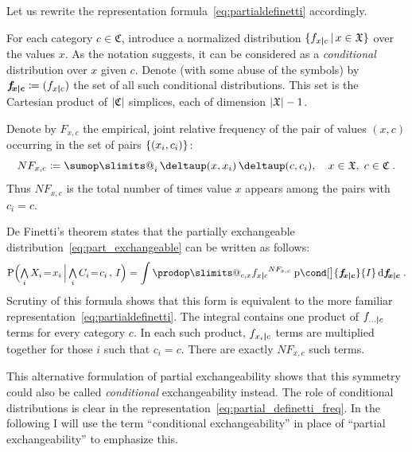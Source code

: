 \documentclass[\ifafour a4paper,12pt,\else a5paper,10pt,\fi%
onecolumn,oneside,article,%
british%
]{memoir}
\makeatletter
\theoremstyle{remark}
\theoremstyle{innote}
\def\sum{\DOTSI\sumop\slimits@}
\def\prod{\DOTSI\prodop\slimits@}
\newcommand*{\delt}{\deltaup}%
\newcommand*{\di}{\mathrm{d}}%
\newcommand*{\defd}{\coloneqq}
\newcommand*{\Land}{\mathop{\textstyle\bigwedge}}
\DeclarePairedDelimiter\abs{\lvert}{\rvert}
\DeclarePairedDelimiter\set{\{}{\}}
\newcommand*{\pf}{\mathrm{p}}%
\newcommand*{\p}{\mathrm{P}}%
\renewcommand*{\|}[1][]{\nonscript\,#1\vert\nonscript\,\mathopen{}}
\newcommand*{\sect}{\S}%
\newcommand*{\tsum}{\mathop{\textstyle\sum}\nolimits}
\renewcommand*{\=}{\TextOrMath\texteq\eq}
\newcommand*{\X}[1]{X_{#1}}
\newcommand*{\x}[1]{x_{#1}}
\newcommand*{\C}[1]{C_{#1}}
\newcommand*{\cc}[1]{c_{#1}}
\newcommand*{\sx}{\mathfrak{X}}
\newcommand*{\sC}{\mathfrak{C}}
\newcommand*{\fxc}{\bm{f_{\!x\bcond c}}}
\newcommand*{\bcond}[1][]{\nonscript\,#1\bm{\vert}\nonscript\;\mathopen{}}
\makeatother
\begin{document}

Let us rewrite the representation formula~\eqref{eq:partialdefinetti}
accordingly.


For each category $c \in \sC$, introduce a normalized distribution
$\set{f_{x \bcond c} \| x \in \sx}$ over the values $x$. As the notation
suggests, it can be considered as a \emph{conditional} distribution over
$x$ given $c$. Denote (with some abuse of the symbols) by
$\fxc \defd (f_{x \bcond c})$ the set of all such conditional
distributions. This set is the Cartesian product of $\abs{\sC}$ simplices,
each of dimension $\abs{\sx}-1$.

Denote by $F_{x,c}$ the empirical, joint relative frequency of the pair of
values $(x,c)$ occurring in the set of pairs
$\set{(\x{i}, \cc{i})}$:
\begin{equation}
  \label{eq:rel_frequencies}
  N F_{x,c} \defd \tsum_{i}\delt(x, \x{i})\,\delt(c, \cc{i}),
  \quad x \in \sx,\; c \in \sC \;.
\end{equation}
Thus $N F_{x,c}$ is the total number of times value $x$ appears among the
pairs with $\cc{i}=c$.

De Finetti’s theorem states that the partially exchangeable
distribution~\eqref{eq:part_exchangeable} can be written as follows:
\begin{equation}
  \label{eq:partial_definetti_freq}
    \p\Bigl(\Land_{i} \X{i}\=\x{i} \|[\Big]
    \Land_{i}\C{i}\=\cc{i}\,,\,  I\Bigr) =
\int\prod_{c,x} {f_{x \bcond c}}^{N F_{x, c}}\;
\pf\cond[\big]{\fxc}{I} \,\di\fxc \;.
\end{equation}
Scrutiny of this formula shows that this form is equivalent to the more
familiar representation~\eqref{eq:partialdefinetti}. The integral contains
one product of $f_{\dotso \bcond c}$ terms for every category $c$. In each
such product, $f_{\x{i} \bcond c}$ terms are multiplied together for those
$i$ such that $\cc{i}=c$. There are exactly $N F_{x,c}$ such terms.

This alternative formulation of partial exchangeability shows that this
symmetry could also be called \emph{conditional} exchangeability instead.
The role of conditional distributions is clear in the
representation~\eqref{eq:partial_definetti_freq}. In the following I will
use the term \enquote{conditional exchangeability} in place of
\enquote{partial exchangeability} to emphasize this.
\end{document}
